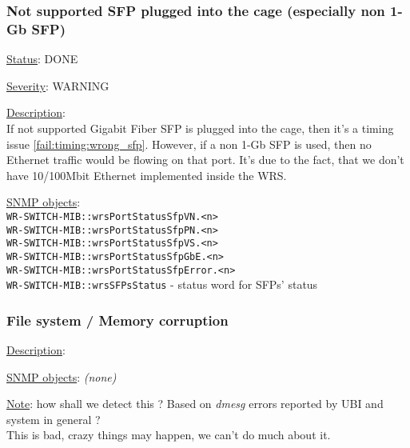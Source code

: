 \subsubsection{\bf Not supported SFP plugged into the cage (especially non 1-Gb SFP)}
		\label{fail:other:sfp}
		\begin{packed_enum}
			\item [] \underline{Status}: DONE
			\item [] \underline{Severity}: WARNING
			\item [] \underline{Description}:\\
				If not supported Gigabit Fiber SFP is plugged into the cage, then it's a
				timing issue \ref{fail:timing:wrong_sfp}. However, if a non 1-Gb SFP is
				used, then no Ethernet traffic would be flowing on that port. It's due
				to the fact, that we don't have 10/100Mbit Ethernet implemented inside
				the WRS.
			\item [] \underline{SNMP objects}:\\
				\texttt{WR-SWITCH-MIB::wrsPortStatusSfpVN.<n>}\\
				\texttt{WR-SWITCH-MIB::wrsPortStatusSfpPN.<n>}\\
				\texttt{WR-SWITCH-MIB::wrsPortStatusSfpVS.<n>}\\
				\texttt{WR-SWITCH-MIB::wrsPortStatusSfpGbE.<n>}\\
				\texttt{WR-SWITCH-MIB::wrsPortStatusSfpError.<n>}\\
				\texttt{WR-SWITCH-MIB::wrsSFPsStatus} - status word for SFPs' status
		\end{packed_enum}

\subsubsection{\bf File system / Memory corruption}
		\label{fail:other:memory}
		\begin{packed_enum}
			\item [] \underline{Description}:\\
			\item [] \underline{SNMP objects}: \emph{(none)}
			\item [] \underline{Note}: how shall we detect this ? Based on
				\emph{dmesg} errors reported by UBI and system in general ?\\
				This is bad, crazy things may happen, we can't do much about it.
		\end{packed_enum}

